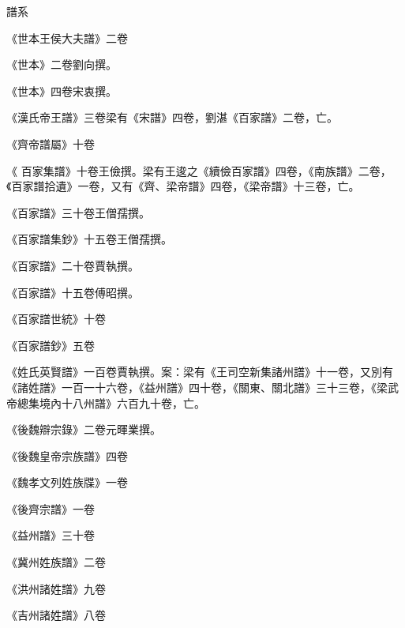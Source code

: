 \begin{pinyinscope}
 譜系



 《世本王侯大夫譜》二卷



 《世本》二卷劉向撰。



 《世本》四卷宋衷撰。



 《漢氏帝王譜》三卷梁有《宋譜》四卷，劉湛《百家譜》二卷，亡。



 《齊帝譜屬》十卷



 《
 百家集譜》十卷王儉撰。梁有王逡之《續儉百家譜》四卷，《南族譜》二卷，《百家譜拾遺》一卷，又有《齊、梁帝譜》四卷，《梁帝譜》十三卷，亡。



 《百家譜》三十卷王僧孺撰。



 《百家譜集鈔》十五卷王僧孺撰。



 《百家譜》二十卷賈執撰。



 《百家譜》十五卷傅昭撰。



 《百家譜世統》十卷



 《百家譜鈔》五卷



 《姓氏英賢譜》一百卷賈執撰。案：梁有《王司空新集諸州譜》十一卷，又別有《諸姓譜》一百一十六卷，《益州譜》四十卷，《關東、關北譜》三十三卷，《梁武帝總集境內十八州譜》六百九十卷，亡。



 《後魏辯宗錄》二卷元暉業撰。



 《後魏皇帝宗族譜》四卷



 《魏孝文列姓族牒》一卷



 《後齊宗譜》一卷



 《益州譜》三十卷



 《冀州姓族譜》二卷



 《洪州諸姓譜》九卷



 《吉州諸姓譜》八卷




\end{pinyinscope}
